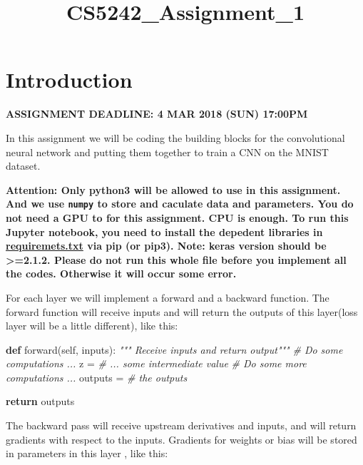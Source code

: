 \documentclass[11pt]{article}
\title{CS5242\_Assignment\_1}
\newenvironment{Shaded}{}{}
\newcommand{\KeywordTok}[1]{\textcolor[rgb]{0.00,0.44,0.13}{\textbf{{#1}}}}
\newcommand{\CommentTok}[1]{\textcolor[rgb]{0.38,0.63,0.69}{\textit{{#1}}}}
\newcommand{\NormalTok}[1]{{#1}}
\newcommand{\VariableTok}[1]{\textcolor[rgb]{0.10,0.09,0.49}{{#1}}}
\newcommand{\ControlFlowTok}[1]{\textcolor[rgb]{0.00,0.44,0.13}{\textbf{{#1}}}}
\newcommand{\OperatorTok}[1]{\textcolor[rgb]{0.40,0.40,0.40}{{#1}}}
\begin{document}
    
    
    \maketitle
    
    

    
    \section{Introduction}\label{introduction}

\textbf{ASSIGNMENT DEADLINE: 4 MAR 2018 (SUN) 17:00PM}

In this assignment we will be coding the building blocks for the
convolutional neural network and putting them together to train a CNN on
the MNIST dataset.

\textbf{Attention: Only python3 will be allowed to use in this
assignment. And we use \texttt{numpy} to store and caculate data and
parameters. You do not need a GPU to for this assignment. CPU is enough.
To run this Jupyter notebook, you need to install the depedent libraries
in \href{requirements.txt}{requiremets.txt} via pip (or pip3). Note:
keras version should be \textgreater{}=2.1.2. Please do not run this
whole file before you implement all the codes. Otherwise it will occur
some error.}

For each layer we will implement a forward and a backward function. The
forward function will receive inputs and will return the outputs of this
layer(loss layer will be a little different), like this:

\begin{Shaded}
\begin{Highlighting}[]
\KeywordTok{def}\NormalTok{ forward(}\VariableTok{self}\NormalTok{, inputs):}
  \CommentTok{""" Receive inputs and return output"""}
  \CommentTok{# Do some computations ...}
\NormalTok{  z }\OperatorTok{=} \CommentTok{# ... some intermediate value}
  \CommentTok{# Do some more computations ...}
\NormalTok{  outputs }\OperatorTok{=} \CommentTok{# the outputs}
    
  \ControlFlowTok{return}\NormalTok{ outputs}
\end{Highlighting}
\end{Shaded}

The backward pass will receive upstream derivatives and inputs, and will
return gradients with respect to the inputs. Gradients for weights or
bias will be stored in parameters in this layer , like this:
\end{document}
